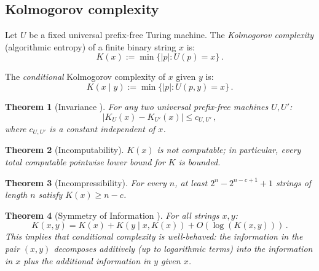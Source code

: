 \documentclass[aps,prd,twocolumn,superscriptaddress,nofootinbib]{revtex4-2}
\newtheorem{theorem}{Theorem}[section]
\theoremstyle{definition}
\theoremstyle{remark}
\begin{document}
\subsection{Kolmogorov complexity}

Let $U$ be a fixed universal prefix-free Turing machine. The \textit{Kolmogorov complexity} (algorithmic entropy) of a finite binary string $x$ is:
\begin{equation}
K(x) := \min\{|p| : U(p) = x\}\,.
\label{eq:kolmogorov}
\end{equation}

The \textit{conditional} Kolmogorov complexity of $x$ given $y$ is:
\begin{equation}
K(x \mid y) := \min\{|p| : U(p, y) = x\}\,.
\label{eq:conditional_K}
\end{equation}

\begin{theorem}[Invariance {\cite{Kolmogorov1965,Solomonoff1964,Chaitin1966}}]
\label{thm:invariance}
For any two universal prefix-free machines $U, U'$:
\begin{equation}
|K_U(x) - K_{U'}(x)| \leq c_{U,U'}\,,
\end{equation}
where $c_{U,U'}$ is a constant independent of $x$.
\end{theorem}

\begin{theorem}[Incomputability]
\label{thm:incomputable}
$K(x)$ is not computable; in particular, every total computable pointwise lower bound for $K$ is bounded.
\end{theorem}

\begin{theorem}[Incompressibility]
\label{thm:incompressible}
For every $n$, at least $2^n - 2^{n-c+1} + 1$ strings of length $n$ satisfy $K(x) \geq n - c$.
\end{theorem}

\begin{theorem}[Symmetry of Information {\cite{LiVitanyi2008}}]
\label{thm:symmetry}
For all strings $x, y$:
\begin{equation}
K(x, y) = K(x) + K(y \mid x, K(x)) + O(\log(K(x, y)))\,.
\end{equation}
This implies that conditional complexity is well-behaved: the information in the pair $(x, y)$ decomposes additively (up to logarithmic terms) into the information in $x$ plus the additional information in $y$ given $x$.
\end{theorem}
\end{document}
